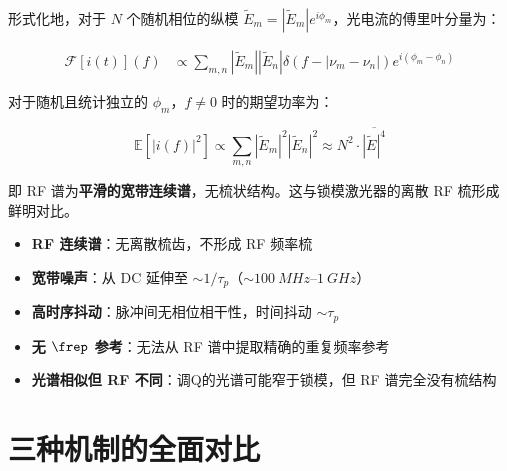 \documentclass[11pt,a4paper]{article}
\newcommand{\FT}{\mathcal{F}}
\begin{document}
形式化地，对于 $N$ 个随机相位的纵模 $\tilde{E}_m = |\tilde{E}_m| e^{i\phi_m}$，光电流的傅里叶分量为：

\begin{equation}\label{eq:qswitch_rf_derivation}
\begin{aligned}
\FT[i(t)](f) &\propto \sum_{m,n} |\tilde{E}_m||\tilde{E}_n| \delta(f - |\nu_m - \nu_n|) e^{i(\phi_m - \phi_n)}
\end{aligned}
\end{equation}

对于随机且统计独立的 $\phi_m$，$f \neq 0$ 时的期望功率为：

\begin{equation}\label{eq:qswitch_rf_result}
\mathbb{E}[|i(f)|^2] \propto \sum_{m,n} |\tilde{E}_m|^2 |\tilde{E}_n|^2 \approx N^2 \cdot \overline{|\tilde{E}|^4}
\end{equation}

即 RF 谱为\textbf{平滑的宽带连续谱}，无梳状结构。这与锁模激光器的离散 RF 梳形成鲜明对比。

\begin{tcolorbox}[width=0.95\textwidth, colback=red!5, colframe=red!50, title=调Q脉冲 RF 特征总结]
\begin{itemize}
    \item \textbf{RF 连续谱}：无离散梳齿，不形成 RF 频率梳
    \item \textbf{宽带噪声}：从 DC 延伸至 $\sim 1/\tau_p$（$\sim\SI{100}{MHz}$--$\SI{1}{GHz}$）
    \item \textbf{高时序抖动}：脉冲间无相位相干性，时间抖动 $\sim \tau_p$
    \item \textbf{无 $\frep$ 参考}：无法从 RF 谱中提取精确的重复频率参考
    \item \textbf{光谱相似但 RF 不同}：调Q的光谱可能窄于锁模，但 RF 谱完全没有梳结构
\end{itemize}
\end{tcolorbox}

\section{三种机制的全面对比}
\end{document}
